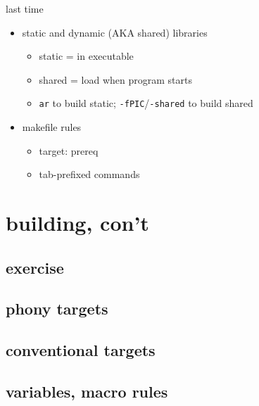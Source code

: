 \date{}
\title{}
\date{}

\begin{frame}
    \titlepage
\end{frame}



\begin{frame}{last time}
    \begin{itemize}
        \item static and dynamic (AKA shared) libraries
            \begin{itemize}
            \item static = in executable
            \item shared = load when program starts
            \item \texttt{ar} to build static; \texttt{-fPIC}/\texttt{-shared} to build shared
            \end{itemize}
        \item makefile rules
            \begin{itemize}
            \item target: prereq
            \item tab-prefixed commands
            \end{itemize}
    \end{itemize}
\end{frame}

\section{building, con't}

\subsection{exercise}


\subsection{phony targets}



\subsection{conventional targets}



\subsection{variables, macro rules}

